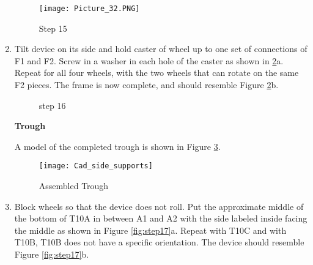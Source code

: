 \documentclass[11pt,english]{article}
\begin{document}
\begin{enumerate}
\begin{figure}[ht!]
\centering
\texttt{[image: Picture\_32.PNG]}
\caption{Step 15}
\label{fig:step 15}
\end{figure}

\item Tilt device on its side and hold caster of wheel up to one set of connections of F1 and F2. Screw in a washer in each hole of the caster as shown in \ref{fig:step 16}a. Repeat for all four wheels, with the two wheels that can rotate on the same F2 pieces. The frame is now complete, and should resemble Figure \ref{fig:step 16}b.   

 \begin{figure}[ht!]%
    \centering
    \qquad
    \caption{step 16}%
    \label{fig:step 16}%
\end{figure}
\newpage
\textbf{Trough}

A model of the completed trough is shown in Figure \ref{fig:assembled}.
\begin{figure}[ht!]
\centering
\texttt{[image: Cad\_side\_supports]}
\caption{Assembled Trough}
\label{fig:assembled}
\end{figure}

\newpage
\item  Block wheels so that the device does not roll. Put the approximate middle of the bottom of T10A in between A1 and A2 with the side labeled inside facing the middle as shown in Figure \ref{fig:step17}a. Repeat with T10C and with T10B, T10B does not have a specific orientation. The device should resemble Figure \ref{fig:step17}b.

\begin{figure}[ht!]%
    \centering
    \qquad
    

\end{figure}
\end{enumerate}
\end{document}
